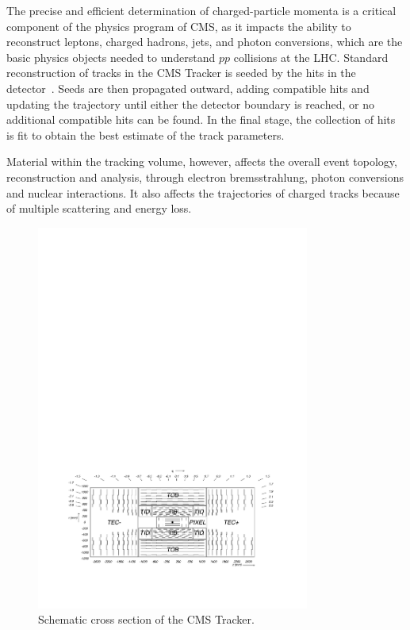 \documentclass[a4paper]{jpconf}
\begin{document}
The precise and efficient determination of charged-particle momenta is a
critical component of the physics program of CMS, as it impacts the ability to
reconstruct leptons, charged hadrons, jets, and photon conversions, which
are the basic physics objects needed to understand $pp$ collisions at the LHC.
Standard reconstruction of tracks in
the CMS Tracker is seeded by the hits in the
detector~\cite{TRK-10-001}.  Seeds are then
propagated outward, adding compatible hits and updating the trajectory
until either the detector boundary is reached, or no additional
compatible hits can be found.  In the final stage, the collection of
hits is fit to obtain the best estimate of the track parameters.

Material within the tracking volume, however, affects the overall
event topology, reconstruction and analysis, through electron
bremsstrahlung, photon conversions and nuclear interactions. It also
affects the trajectories of charged tracks because of multiple
scattering and energy loss.

\begin{figure}[h!]
  \begin{center}
    \includegraphics[width=0.8\textwidth]{fig/general_layout.pdf}
    \caption{Schematic cross section of the CMS Tracker.}
    \label{fig:tklayout}
  \end{center}
\end{figure}
\end{document}
